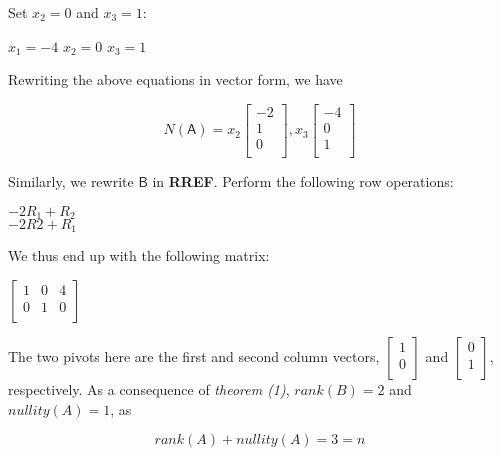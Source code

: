 \documentclass[a4paper, 11pt]{article}
\newcommand{\mat}[1]{\boldsymbol { \mathsf{#1}} }
\begin{document}
\begin{enumerate}
Set $x_2 = 0$ and $x_3 = 1$:

\begin{center}
    $x_1 = -4$
    $x_2 = 0$
    $x_3 = 1$
\end{center}

Rewriting the above equations in vector form, we have

\begin{equation*}
    N(\mat{A}) = x_2 
    \begin{bmatrix}
    -2 \\
    1 \\
    0 \\
    \end{bmatrix},
    x_3
    \begin{bmatrix}
    -4 \\
    0 \\
    1 \\
    \end{bmatrix}
\end{equation*}

Similarly, we rewrite $\mat{B}$ in \textbf{RREF}. Perform the following row operations:

\begin{center}
	$-2R_1 + R_2$ \\
	$-2R2 + R_1$ \\
\end{center}

We thus end up with the following matrix:

\begin{center}
	$
	\begin{bmatrix}
	1 & 0 & 4 \\
	0 & 1 & 0 \\
	\end{bmatrix}
	$
\end{center}

The two pivots here are the first and second column vectors, $\begin{bmatrix}
1 \\
0 \\
\end{bmatrix}$ and $\begin{bmatrix}
0 \\
1 \\
\end{bmatrix}$, respectively. As a consequence of \textit{theorem (1)}, $rank(B) = 2$ and $nullity(A) = 1$, as 

\begin{equation*}
    rank(A) + nullity(A) = 3 = n
\end{equation*}


\end{enumerate}
\end{document}
